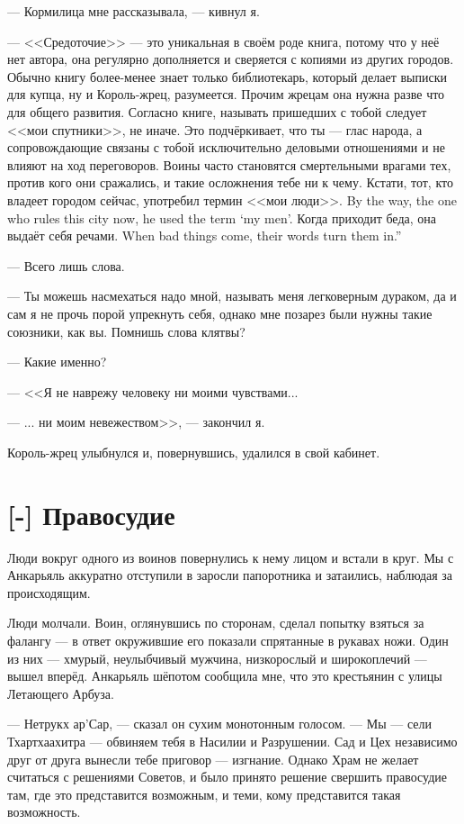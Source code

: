 --- Кормилица мне рассказывала, --- кивнул я.

--- <<Средоточие>> --- это уникальная в своём роде книга, потому что у неё нет автора, она регулярно дополняется и сверяется с копиями из других городов.
Обычно книгу более-менее знает только библиотекарь, который делает выписки для купца, ну и Король-жрец, разумеется.
Прочим жрецам она нужна разве что для общего развития.
Согласно книге, называть пришедших с тобой следует <<мои спутники>>, не иначе.
Это подчёркивает, что ты --- глас народа, а сопровождающие связаны с тобой исключительно деловыми отношениями и не влияют на ход переговоров.
Воины часто становятся смертельными врагами тех, против кого они сражались, и такие осложнения тебе ни к чему.
{Кстати, тот, кто владеет городом сейчас, употребил термин <<мои люди>>.}
{By the way, the one who rules this city now, he used the term `my men'.}
{Когда приходит беда, она выдаёт себя речами.}
{When bad things come, their words turn them in.''}

--- Всего лишь слова.

--- Ты можешь насмехаться надо мной, называть меня легковерным дураком, да и сам я не прочь порой упрекнуть себя, однако мне позарез были нужны такие союзники, как вы.
Помнишь слова клятвы?

--- Какие именно?

--- <<Я не наврежу человеку ни моими чувствами...

--- ... ни моим невежеством>>, --- закончил я.

Король-жрец улыбнулся и, повернувшись, удалился в свой кабинет.

\section{[-] Правосудие}

\textspace

Люди вокруг одного из воинов повернулись к нему лицом и встали в круг.
Мы с Анкарьяль аккуратно отступили в заросли папоротника и затаились, наблюдая за происходящим.

Люди молчали.
Воин, оглянувшись по сторонам, сделал попытку взяться за фалангу --- в ответ окружившие его показали спрятанные в рукавах ножи.
Один из них --- хмурый, неулыбчивый мужчина, низкорослый и широкоплечий --- вышел вперёд.
Анкарьяль шёпотом сообщила мне, что это крестьянин с улицы Летающего Арбуза.

--- Нетрукх ар’Сар, --- сказал он сухим монотонным голосом.
--- Мы --- сели Тхартхаахитра --- обвиняем тебя в Насилии и Разрушении.
Сад и Цех независимо друг от друга вынесли тебе приговор --- изгнание.
Однако Храм не желает считаться с решениями Советов, и было принято решение свершить правосудие там, где это представится возможным, и теми, кому представится такая возможность.

